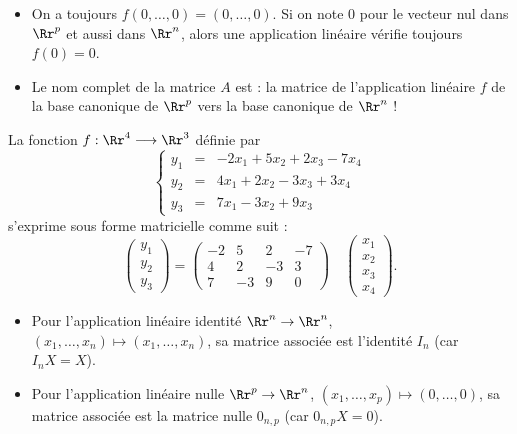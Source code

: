 \documentclass[class=report,crop=false]{standalone}
\begin{document}
\begin{remarque*}
\sauteligne
\begin{itemize}
  \item On a toujours $f(0,\ldots,0) = (0,\ldots,0)$. Si on note $0$ pour le vecteur nul
dans $\Rr^p$ et aussi dans $\Rr^n$, alors une application linéaire vérifie toujours $f(0)=0$.
  \item Le nom complet de la matrice $A$ est : la matrice de l'application linéaire $f$
  de la base canonique de $\Rr^p$ vers la base canonique de $\Rr^n$ !
\end{itemize}
\end{remarque*}




\begin{exemple}
La fonction $f: \Rr^4 \longrightarrow \Rr^3$ définie par
$$\left\{\begin{array}{rcl}
y_1 & = & -2x_1 + 5x_2 + 2x_3 - 7x_4\\
y_2 & = & 4x_1 + 2x_2 - 3x_3 + 3x_4\\
y_3 & = & 7x_1 - 3x_2 + 9x_3
\end{array}\right.$$
s'exprime sous forme matricielle comme suit :
$$\begin{pmatrix} y_1\\ y_2\\ y_3 \end{pmatrix} =
\begin{pmatrix}
-2 & 5 & 2 & -7\\
4 & 2 & -3 & 3\\
7 & -3 & 9 & 0
\end{pmatrix}\quad
\begin{pmatrix}x_1\\ x_2\\ x_3\\ x_4 \end{pmatrix}.$$
\end{exemple}


\begin{exemple}
\sauteligne
\begin{itemize}
  \item Pour l'application linéaire identité $\Rr^n \to \Rr^n$, $(x_1,\ldots,x_n) \mapsto (x_1,\ldots,x_n)$, sa matrice associée
  est l'identité $I_n$ (car $I_n X= X$).

  \item Pour l'application linéaire nulle $\Rr^p \to \Rr^n$, $(x_1,\ldots,x_p) \mapsto (0,\ldots,0)$, sa matrice associée
  est la matrice nulle $0_{n,p}$ (car $0_{n,p} X= 0$).
\end{itemize}
\end{exemple}
\end{document}
